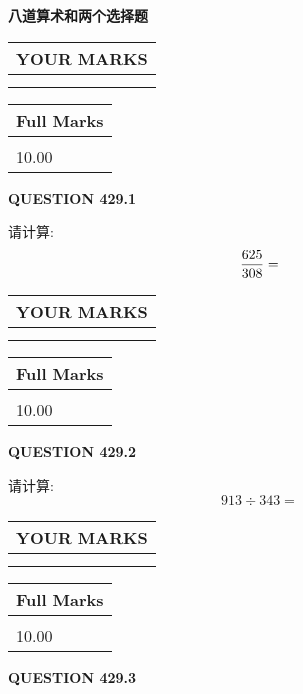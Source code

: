 \documentclass{ctexart}
\begin{document}
   
 \vspace{0.2in}
{\LARGE {\textbf{ 八道算术和两个选择题}}}
   
   
  
\vspace{0.2in}
  
\noindent\begin{tabular}{|l|}
\hline
 YOUR MARKS  \\
\hline
 \\ 
 \\ 
\hline
\end{tabular}
\hspace{0.05in} \begin{tabular}{|l|}
\hline
 Full Marks  \\
\hline
 \\ 
10.00 \\
\hline
\end{tabular}
{\textbf{\Large{QUESTION
429.1 
}}}
  
  
 
请计算:
\begin{equation}
\frac { %
625 }  {  %
308} = \nonumber
\end{equation}
 

 

 
  
\vspace{0.2in}
  
\noindent\begin{tabular}{|l|}
\hline
 YOUR MARKS  \\
\hline
 \\ 
 \\ 
\hline
\end{tabular}
\hspace{0.05in} \begin{tabular}{|l|}
\hline
 Full Marks  \\
\hline
 \\ 
10.00 \\
\hline
\end{tabular}
{\textbf{\Large{QUESTION
429.2 
}}}
  
  
 
请计算:
\begin{equation}
913  \div    %
343 = \nonumber
\end{equation}
 

 

 
  
\vspace{0.2in}
  
\noindent\begin{tabular}{|l|}
\hline
 YOUR MARKS  \\
\hline
 \\ 
 \\ 
\hline
\end{tabular}
\hspace{0.05in} \begin{tabular}{|l|}
\hline
 Full Marks  \\
\hline
 \\ 
10.00 \\
\hline
\end{tabular}
{\textbf{\Large{QUESTION
429.3 
}}}
  
\end{document}
